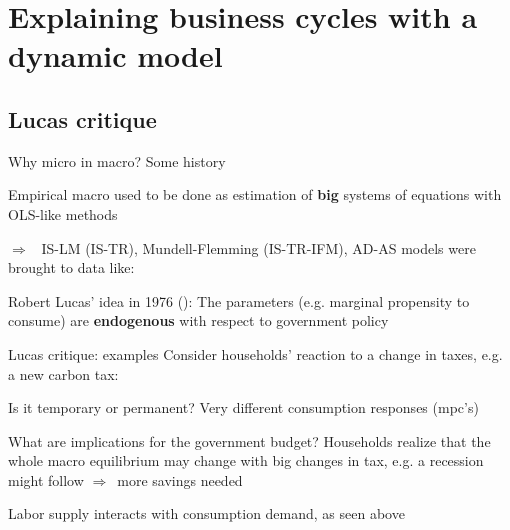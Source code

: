 \documentclass{beamer}
\newcommand{\tb}[1]{{\color{blue}{\textbf{#1}}}}
\newenvironment{mytemize}
{\vfill\itemize[nolistsep,itemsep=\fill,label=\color{blue}{$\triangleright$}]}
  {\enditemize}
\newcommand{\rarr}{$\Rightarrow$\ }
\begin{document}
\section{Explaining business cycles with a dynamic model}

\subsection{Lucas critique}
\begin{frame}{Why micro in macro? Some history}

\begin{mytemize}
\item Empirical macro used to be done as estimation of \textbf{big} systems of equations with OLS-like methods
\item[\rarr] IS-LM (IS-TR), Mundell-Flemming (IS-TR-IFM), AD-AS models were brought to data like:
\end{mytemize}
\begin{figure}[h!]
\end{figure}

\begin{mytemize}
\item Robert Lucas' idea in 1976 (\tb{Lucas critique}): The parameters (e.g. marginal propensity to consume) are \textbf{endogenous} with respect to government policy
\end{mytemize}
\end{frame}
\begin{frame}{Lucas critique: examples}
  Consider households' reaction to a change in taxes, e.g. a new carbon tax:
  \begin{mytemize}
  \item Is it temporary or permanent? Very different consumption responses (mpc's)
  \item What are implications for the government budget? Households realize that the whole macro equilibrium may change with big changes in tax, e.g. a recession might follow \rarr more savings needed 
  \item Labor supply interacts with consumption demand, as seen above
  \end{mytemize}
\end{frame}
\end{document}
